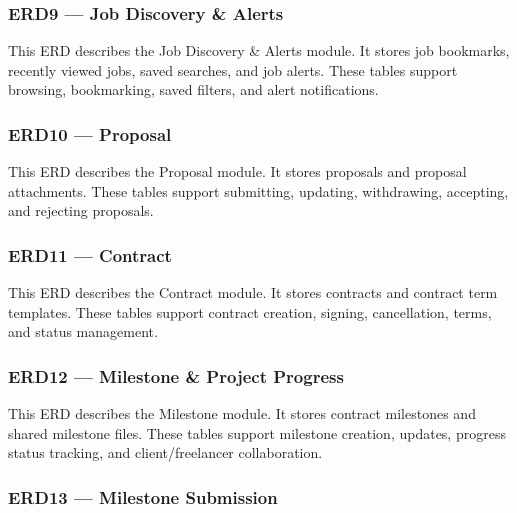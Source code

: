 \subsubsection{ERD9 --- Job Discovery \& Alerts}

This ERD describes the Job Discovery \& Alerts module. It stores job bookmarks, recently viewed jobs, saved searches, and job alerts. These tables support browsing, bookmarking, saved filters, and alert notifications.


\subsubsection{ERD10 --- Proposal}

This ERD describes the Proposal module. It stores proposals and proposal attachments. These tables support submitting, updating, withdrawing, accepting, and rejecting proposals.


\subsubsection{ERD11 --- Contract}

This ERD describes the Contract module. It stores contracts and contract term templates. These tables support contract creation, signing, cancellation, terms, and status management.


\subsubsection{ERD12 --- Milestone \& Project Progress}

This ERD describes the Milestone module. It stores contract milestones and shared milestone files. These tables support milestone creation, updates, progress status tracking, and client/freelancer collaboration.


\subsubsection{ERD13 --- Milestone Submission}

